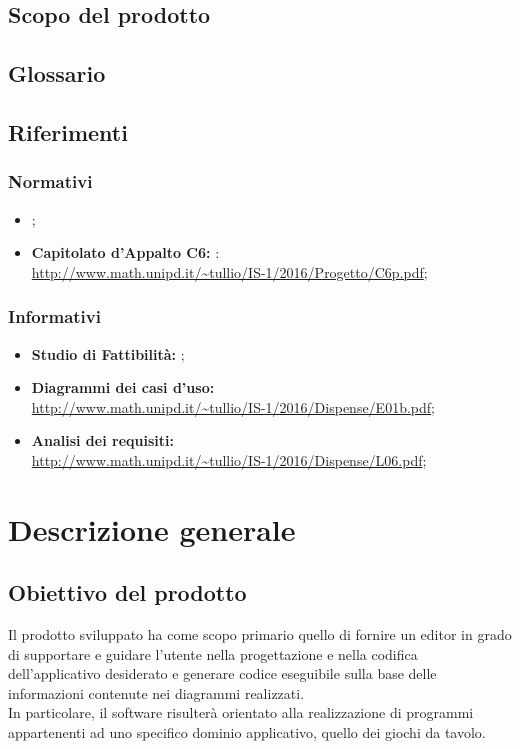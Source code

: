 	\subsection{Scopo del prodotto}
	\scopo{}
	
	\subsection{Glossario}
	\presgloss{}
	
	\subsection{Riferimenti}
		\subsubsection{Normativi}
		\begin{itemize}
			\item \emph{\NdP};
			\item \textbf{Capitolato d'Appalto C6: \proj}:
			\\ \url{http://www.math.unipd.it/~tullio/IS-1/2016/Progetto/C6p.pdf};
		\end{itemize}
		
		\subsubsection{Informativi}
		\begin{itemize}
			\item \textbf{Studio di Fattibilità: }\emph{\SdF};
			\item \textbf{Diagrammi dei casi d'uso:}
			\\ \url{http://www.math.unipd.it/~tullio/IS-1/2016/Dispense/E01b.pdf};
			\item \textbf{Analisi dei requisiti:}
			\\ \url{http://www.math.unipd.it/~tullio/IS-1/2016/Dispense/L06.pdf};
		\end{itemize}
\newpage

\section{Descrizione generale}
	\subsection{Obiettivo del prodotto}
	Il prodotto sviluppato  ha come scopo primario quello di fornire un editor in grado di supportare e guidare l'utente nella progettazione e nella codifica dell'applicativo desiderato e generare codice eseguibile sulla base delle informazioni contenute nei diagrammi realizzati. 
	\\In particolare, il software risulterà orientato alla realizzazione di programmi appartenenti ad uno specifico dominio applicativo, quello dei giochi da tavolo.
